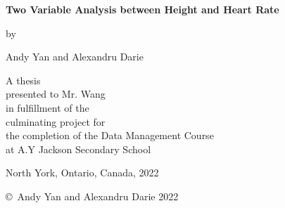 \pagestyle{empty}

\begin{titlepage}
        \begin{center}
        \vspace*{1.0cm}

        \Huge
        {\bf Two Variable Analysis between Height and Heart Rate  }

        \vspace*{1.0cm}

        \normalsize
        by \\

        \vspace*{1.0cm}

        \Large
        Andy Yan and Alexandru Darie \\

        \vspace*{3.0cm}

        \normalsize
        A thesis \\
        presented to Mr. Wang \\ 
        in fulfillment of the \\
        culminating project for \\
        the completion of the Data Management Course\\
        at A.Y Jackson Secondary School\\

        \vspace*{2.0cm}

       North York, Ontario, Canada, 2022 \\

        \vspace*{1.0cm}

        \copyright\ Andy Yan and Alexandru Darie 2022 \\
        \end{center}
\end{titlepage}

\pagestyle{plain}
\setcounter{page}{2}

